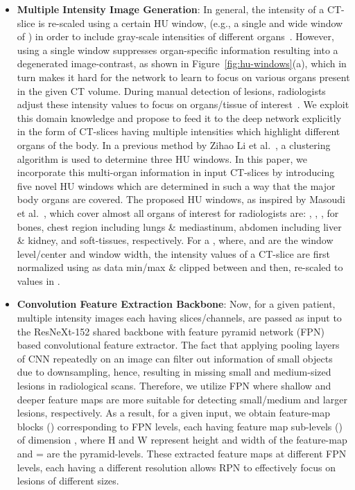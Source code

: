 \documentclass{bmvc2k}
\begin{document}
\begin{itemize}
\item \textbf{Multiple Intensity Image Generation}: In general, the intensity of a CT-slice is re-scaled using a certain HU window,  (e.g., a single and wide window of ) in order to include gray-scale intensities of different organs~\cite{tang2019uldor, 3dce}. However, using a single window suppresses organ-specific information resulting into a degenerated image-contrast, as shown in Figure~\ref{fig:hu-windows}(a), which in turn makes it hard for the network to learn to focus on various organs present in the given CT volume. During manual detection of lesions, radiologists adjust these intensity values to focus on organs/tissue of interest~\cite{bae2005ct}. We exploit this domain knowledge and propose to feed it to the deep network explicitly in the form of CT-slices having multiple intensities which highlight different organs of the body. In a previous method by Zihao Li et al.~\cite{li2019mvp}, a clustering algorithm is used to determine three HU windows. In this paper, we incorporate this multi-organ information in input CT-slices by introducing five novel HU windows which are determined in such a way that the major body organs are covered. The proposed HU windows, as inspired by Masoudi et al.~\cite{masoudi2021quick}, which cover almost all organs of interest for radiologists are: , , ,   for bones, chest region including lungs \& mediastinum, abdomen including liver \& kidney, and soft-tissues, respectively. For a , where,  and  are the window level/center and window width, the intensity values of a CT-slice are first normalized using  as data min/max \& clipped between  and then, re-scaled to values in .


\vspace{-2mm}
\item \textbf{Convolution Feature Extraction Backbone}: Now, for a given patient,  multiple intensity images each having  slices/channels, are passed as input to the ResNeXt-152 shared backbone with feature pyramid network (FPN)~\cite{lin2017featurefpn} based convolutional feature extractor.
The fact that applying pooling layers of CNN repeatedly on an image can filter out information of small objects due to downsampling, hence, resulting in missing small and medium-sized lesions in radiological scans. Therefore, we utilize FPN where shallow and deeper feature maps are more suitable for detecting small/medium and larger lesions, respectively. As a result, for a given input, we obtain  feature-map blocks () corresponding to  FPN levels, each having  feature map sub-levels () of dimension , where H and W represent height and width of the feature-map and  =  are the pyramid-levels. These extracted feature maps at different FPN levels, each having a different resolution allows RPN to effectively focus on lesions of different sizes.




\end{itemize}
\end{document}
